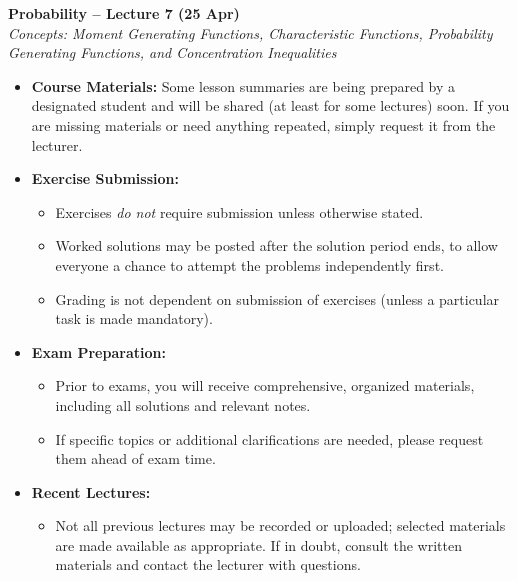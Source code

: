 \documentclass[12pt]{article}
\newenvironment{administrative_note}
  {\begin{center}\begin{Sbox}\begin{minipage}{0.9\textwidth}\small\textbf{Administrative Information:}\par}
  {\end{minipage}\end{Sbox}\fbox{\TheSbox}\end{center}}
\begin{document}
\begin{center}
    {\LARGE\bf Probability -- Lecture 7 (25 Apr)}\\
    \vspace{0.2em}
    {\large\it Concepts: Moment Generating Functions, Characteristic Functions, Probability Generating Functions, and Concentration Inequalities}
\end{center}

\vspace{1.5em}

\begin{administrative_note}
\begin{itemize}[leftmargin=1.7em]
    \item \textbf{Course Materials:} Some lesson summaries are being prepared by a designated student and will be shared (at least for some lectures) soon. If you are missing materials or need anything repeated, simply request it from the lecturer.
    \item \textbf{Exercise Submission:} 
    \begin{itemize}
        \item Exercises \emph{do not} require submission unless otherwise stated.
        \item Worked solutions may be posted after the solution period ends, to allow everyone a chance to attempt the problems independently first.
        \item Grading is not dependent on submission of exercises (unless a particular task is made mandatory).
    \end{itemize}
    \item \textbf{Exam Preparation:}
    \begin{itemize}
        \item Prior to exams, you will receive comprehensive, organized materials, including all solutions and relevant notes.
        \item If specific topics or additional clarifications are needed, please request them ahead of exam time.
    \end{itemize}
    \item \textbf{Recent Lectures:}
    \begin{itemize}
        \item Not all previous lectures may be recorded or uploaded; selected materials are made available as appropriate. If in doubt, consult the written materials and contact the lecturer with questions.
    \end{itemize}

\end{itemize}
\end{administrative_note}
\end{document}
